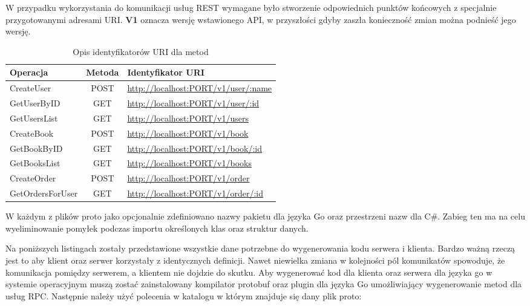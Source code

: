 \par W przypadku wykorzystania do komunikacji usług REST wymagane było stworzenie odpowiednich punktów końcowych z specjalnie przygotowanymi adresami URI. \textbf{V1} oznacza wersję wstawionego API, w przyszłości gdyby zaszła konieczność zmian można podnieść jego wersję.
\begin{table}[h]
    \begin{center}
        \caption{Opis identyfikatorów URI dla metod}
        \hspace*{-1cm}
        \begin{tabular}{|M|c|L|}
            \toprule
            \textbf{Operacja} & \textbf{Metoda} & \textbf{Identyfikator URI}                \\
            \midrule
            CreateUser        & POST            & \url{http://localhost:PORT/v1/user/:name} \\
            \midrule
            GetUserByID       & GET             & \url{http://localhost:PORT/v1/user/:id}   \\
            \midrule
            GetUsersList      & GET             & \url{http://localhost:PORT/v1/users}      \\
            \midrule
            CreateBook        & POST            & \url{http://localhost:PORT/v1/book}       \\
            \midrule
            GetBookByID       & GET             & \url{http://localhost:PORT/v1/book/:id}   \\
            \midrule
            GetBooksList      & GET             & \url{http://localhost:PORT/v1/books}      \\
            \midrule
            CreateOrder       & POST            & \url{http://localhost:PORT/v1/order}      \\
            \midrule
            GetOrdersForUser  & GET             & \url{http://localhost:PORT/v1/order/:id}  \\
            \bottomrule
        \end{tabular}
        \hspace*{-1cm}
    \end{center}
\end{table}
\par W każdym z plików proto jako opcjonalnie zdefiniowano nazwy pakietu dla języka Go oraz przestrzeni nazw dla C\#. Zabieg ten ma na celu wyeliminowanie pomyłek podczas importu określonych klas oraz struktur danych.
\par Na poniższych listingach zostały przedstawione wszystkie dane potrzebne do wygenerowania kodu serwera i klienta. Bardzo ważną rzeczą jest to aby klient oraz serwer korzystały z identycznych definicji. Nawet niewielka zmiana w kolejności pól komunikatów spowoduje, że komunikacja pomiędzy serwerem, a klientem nie dojdzie do skutku. Aby wygenerować kod dla klienta oraz serwera dla języka go w systemie operacyjnym muszą zostać zainstalowany kompilator protobuf oraz plugin dla języka Go umożliwiający wygenerowanie metod dla usług RPC. Następnie należy użyć polecenia w katalogu w którym znajduje się dany plik proto:
